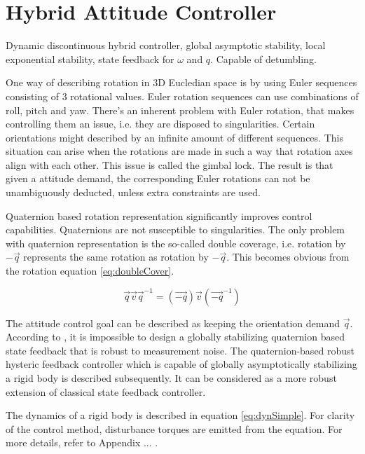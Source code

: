 \section{Hybrid Attitude Controller}

Dynamic discontinuous hybrid controller, global asymptotic stability, local exponential stability, state feedback for $\omega$ and $q$. Capable of detumbling. \cite{globalAttController}

One way of describing rotation in 3D Eucledian space is by using Euler sequences consisting of 3 rotational values. Euler rotation sequences can use combinations of roll, pitch and yaw. There's an inherent problem with Euler rotation, that makes controlling them an issue, i.e. they are disposed to singularities. Certain orientations might described by an infinite amount of different sequences. This situation can arise when the rotations are made in such a way that rotation axes align with each other. This issue is called the gimbal lock. The result is that given a attitude demand, the corresponding Euler rotations can not be unambiguously deducted, unless extra constraints are used.

Quaternion based rotation representation significantly improves control capabilities. Quaternions are not susceptible to singularities. The only problem with quaternion representation is the so-called double coverage, i.e. rotation by $-\vec{q}$ represents the same rotation as rotation by $-\vec{q}$. This becomes obvious from the rotation equation \ref{eq:doubleCover}.

\begin{equation}
\label{eq:doubleCover}
\vec{q} \vec{v} \vec{q}^{-1} = 	(\vec{-q}) \vec{v} (\vec{-q}^{-1})
\end{equation} 

The attitude control goal can be described as keeping the orientation demand $\vec{q}$. According to  \cite{globalAttController}, it is impossible to design a globally stabilizing quaternion based state feedback that is robust to measurement noise. The quaternion-based robust hysteric feedback controller which is capable of globally asymptotically stabilizing a rigid body is described subsequently. It can be considered as a more robust extension of classical state feedback controller.


The dynamics of a rigid body is described in equation \ref{eq:dynSimple}. For clarity of the control method, disturbance torques are emitted from the equation. For more details, refer to Appendix ... .

